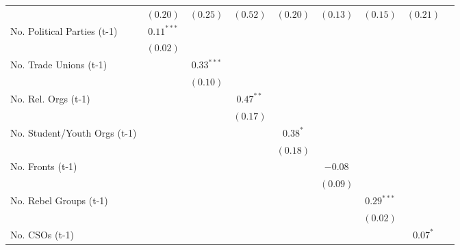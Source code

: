 \begin{table}[!htbp]
\begin{center}
{\begin{tabular}{l c c c c c c c c}
                             & $(0.20)$       & $(0.25)$     & $(0.52)$      & $(0.20)$     & $(0.13)$      & $(0.15)$      & $(0.21)$      &              \\
No. Political Parties (t-1)  & $0.11^{***}$   &              &               &              &               &               &               &              \\
                             & $(0.02)$       &              &               &              &               &               &               &              \\
No. Trade Unions (t-1)       &                & $0.33^{***}$ &               &              &               &               &               &              \\
                             &                & $(0.10)$     &               &              &               &               &               &              \\
No. Rel. Orgs (t-1)          &                &              & $0.47^{**}$   &              &               &               &               &              \\
                             &                &              & $(0.17)$      &              &               &               &               &              \\
No. Student/Youth Orgs (t-1) &                &              &               & $0.38^{*}$   &               &               &               &              \\
                             &                &              &               & $(0.18)$     &               &               &               &              \\
No. Fronts (t-1)             &                &              &               &              & $-0.08$       &               &               &              \\
                             &                &              &               &              & $(0.09)$      &               &               &              \\
No. Rebel Groups (t-1)       &                &              &               &              &               & $0.29^{***}$  &               &              \\
                             &                &              &               &              &               & $(0.02)$      &               &              \\
No. CSOs (t-1)               &                &              &               &              &               &               & $0.07^{*}$    &              \\

\end{tabular}}
\end{center}
\end{table}

